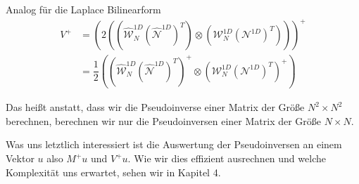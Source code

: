 Analog für die Laplace Bilinearform
\begin{equation}
\begin{aligned}
V^+ &= (2 ((\widehat{\mathcal{W}}_N^{1D} (\widehat{\mathcal{N}}^{1D})^T) \otimes (\mathcal{W}_N^{1D} (\mathcal{N}^{1D})^T)))^+ \\
&= \dfrac{1}{2} ((\widehat{\mathcal{W}}_N^{1D} (\widehat{\mathcal{N}}^{1D})^T)^+ \otimes (\mathcal{W}_N^{1D} (\mathcal{N}^{1D})^T)^+)
\end{aligned}
\end{equation}

Das heißt anstatt, dass wir die Pseudoinverse einer Matrix der Größe $N^2 \times N^2$ berechnen, berechnen wir nur die Pseudoinversen einer Matrix der Größe $N \times N$.

Was uns letztlich interessiert ist die Auswertung der Pseudoinversen an einem Vektor $u$ also $M^+ u$ und $V^+ u$. Wie wir dies effizient ausrechnen und welche Komplexität uns erwartet, sehen wir in Kapitel 4.


